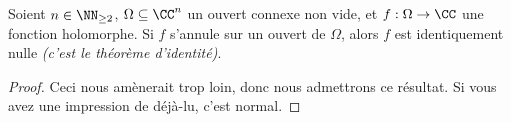 \begin{fact} \label{multi-analytic-nullity}
    Soient $n \in \NN_{\geq 2}$,
    $\Omega \subseteq \CC^n$ un ouvert connexe non vide,
    et
    $f: \Omega \rightarrow \CC$ une fonction holomorphe.
	Si $f$ s'annule sur un ouvert de $\Omega$,
	alors $f$ est identiquement nulle
	\emph{(c'est le théorème d'identité)}. 
\end{fact}


\begin{proof}
	Ceci nous amènerait trop loin, donc nous admettrons ce résultat. Si vous avez une impression de déjà-lu, c'est normal.
\end{proof}
